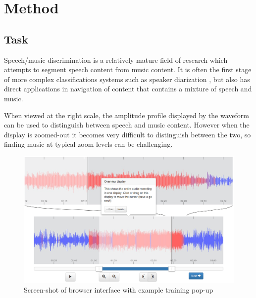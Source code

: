 


\section{Method}

\subsection{Task}
Speech/music discrimination is a relatively mature field of research which attempts to segment speech content from
music content. It is often the first stage of more complex classifications systems such as speaker diarization
\citep{AngueraMiro2012}, but also has direct applications in navigation of content that contains a mixture of speech
and music.

When viewed at the right scale, the amplitude profile displayed by the waveform can be used to distinguish between
speech and music content. However when the display is zoomed-out it becomes very difficult to distinguish between the
two, so finding music at typical zoom levels can be challenging.

\begin{figure}[!h]
\centering
\includegraphics[width=\columnwidth]{figs/interface.png}
\caption{Screen-shot of browser interface with example training pop-up}
\label{fig:iface}
\end{figure}


